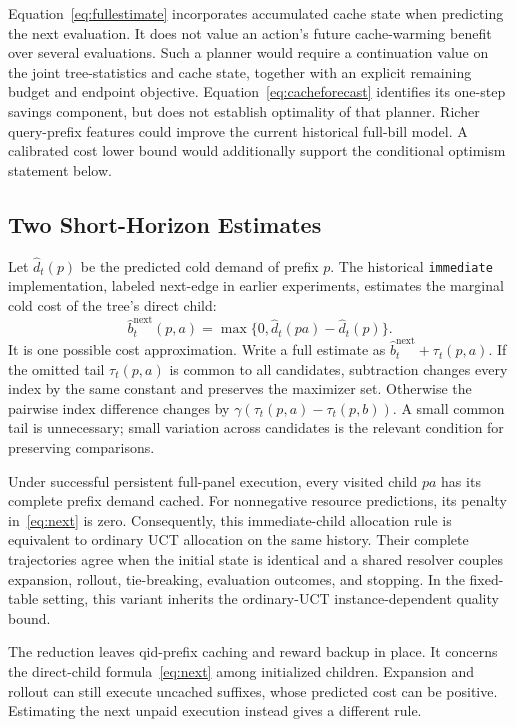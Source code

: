 Equation~\eqref{eq:fullestimate} incorporates accumulated cache state when predicting the next evaluation. It does not value an action's future cache-warming benefit over several evaluations. Such a planner would require a continuation value on the joint tree-statistics and cache state, together with an explicit remaining budget and endpoint objective. Equation~\eqref{eq:cacheforecast} identifies its one-step savings component, but does not establish optimality of that planner. Richer query-prefix features could improve the current historical full-bill model. A calibrated cost lower bound would additionally support the conditional optimism statement below.

\subsection{Two Short-Horizon Estimates}
Let $\widehat d_t(p)$ be the predicted cold demand of prefix $p$. The historical
\texttt{immediate} implementation, labeled next-edge in earlier experiments,
estimates the marginal cold cost of the tree's direct child:
\begin{equation}
 \widehat b_t^{\mathrm{next}}(p,a)=\max\{0,\widehat d_t(pa)-\widehat d_t(p)\}.
 \label{eq:next}
\end{equation}
It is one possible cost approximation. Write a full estimate as $\widehat b_t^{\mathrm{next}}+\tau_t(p,a)$. If the omitted tail $\tau_t(p,a)$ is common to all candidates, subtraction changes every index by the same constant and preserves the maximizer set. Otherwise the pairwise index difference changes by $\gamma(\tau_t(p,a)-\tau_t(p,b))$. A small common tail is unnecessary; small variation across candidates is the relevant condition for preserving comparisons.

\begin{proposition}
\label{prop:next}
Under successful persistent full-panel execution, every visited child $pa$ has its complete prefix demand cached. For nonnegative resource predictions, its penalty in~\eqref{eq:next} is zero. Consequently, this immediate-child allocation rule is equivalent to ordinary UCT allocation on the same history. Their complete trajectories agree when the initial state is identical and a shared resolver couples expansion, rollout, tie-breaking, evaluation outcomes, and stopping. In the fixed-table setting, this variant inherits the ordinary-UCT instance-dependent quality bound.
\end{proposition}
The reduction leaves qid-prefix caching and reward backup in place. It concerns
the direct-child formula~\eqref{eq:next} among initialized children. Expansion
and rollout can still execute uncached suffixes, whose predicted cost can be
positive. Estimating the next unpaid execution instead gives a different rule.

